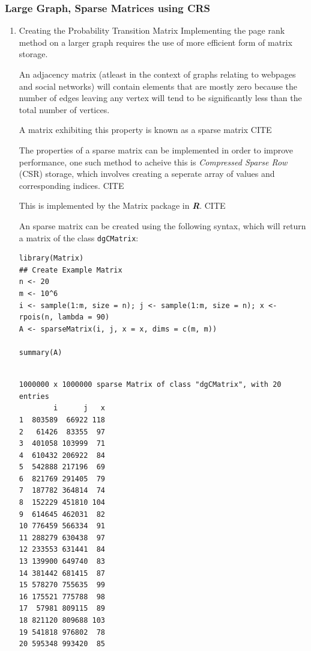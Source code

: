\documentclass[11pt]{article}
\begin{document}
\subsubsection{Large Graph, Sparse Matrices using CRS}
\label{sec:org409d7b9}
\begin{enumerate}
\item Creating the Probability Transition Matrix
\label{sec:org3775f81}
Implementing the page rank method on a larger graph requires the use of more efficient form of matrix storage.

An adjacency matrix (atleast in the context of graphs relating to webpages and social networks) will contain elements that are mostly zero because the number of edges leaving any vertex will tend to be significantly less than the total number of vertices.

A matrix exhibiting this property is known as a sparse matrix CITE

The properties of a sparse matrix can be implemented in order to improve performance, one such method to acheive this is \emph{Compressed Sparse Row} (CSR) storage, which involves creating a seperate array of values and corresponding indices. CITE

This is implemented by the Matrix package in \textbf{\emph{R}}. CITE

An sparse matrix can be created using the following syntax, which will return a matrix of the class \texttt{dgCMatrix}:

\lstset{language=r,label= ,caption= ,captionpos=b,numbers=none}
\begin{lstlisting}
library(Matrix)
## Create Example Matrix
n <- 20
m <- 10^6
i <- sample(1:m, size = n); j <- sample(1:m, size = n); x <- rpois(n, lambda = 90)
A <- sparseMatrix(i, j, x = x, dims = c(m, m))

summary(A)
\end{lstlisting}

\begin{verbatim}

1000000 x 1000000 sparse Matrix of class "dgCMatrix", with 20 entries
        i      j   x
1  803589  66922 118
2   61426  83355  97
3  401058 103999  71
4  610432 206922  84
5  542888 217196  69
6  821769 291405  79
7  187782 364814  74
8  152229 451810 104
9  614645 462031  82
10 776459 566334  91
11 288279 630438  97
12 233553 631441  84
13 139900 649740  83
14 381442 681415  87
15 578270 755635  99
16 175521 775788  98
17  57981 809115  89
18 821120 809688 103
19 541818 976802  78
20 595348 993420  85
\end{verbatim}


\end{enumerate}
\end{document}
